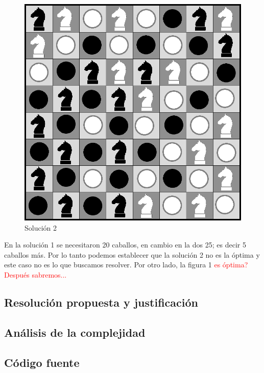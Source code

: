 \documentclass[a4paper]{article}
\begin{document}
\newpage 
 
 
 \begin{figure}[h!]
   \begin{center}
 	\includegraphics[scale=0.3]{imagenes/ej3/con5mas.png}
 	\caption{Soluci\'on 2}
   \end{center}
 \end{figure}

En la soluci\'on 1 se necesitaron 20 caballos, en cambio en la dos 25; es decir 5 caballos m\'as. Por lo tanto podemos establecer que la soluci\'on 2 no es la \'optima y este caso no es lo que buscamos resolver. Por otro lado, la figura 1 \textcolor{red}{es \'optima? Despu\'es sabremos...}

\subsection{Resoluci\'on propuesta y justificaci\'on}


\subsection{An\'alisis de la complejidad}
\subsection{C\'odigo fuente}
\end{document}
